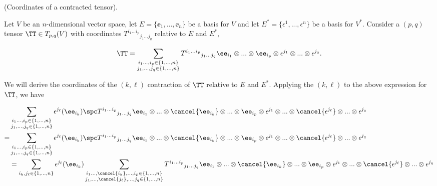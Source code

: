 \begin{deriv}
    (Coordinates of a contracted tensor).

    Let $V$ be an $n$-dimensional vector space, let $E = \{\ee_1, ..., \ee_n\}$ be a basis for $V$ and let $E^* = \{\epsilon^1, ..., \epsilon^n\}$ be a basis for $V^*$. Consider a $(p, q)$ tensor $\TT \in T_{p,q}(V)$ with coordinates $T^{i_1 ... i_p}{}_{j_1 ... j_q}$ relative to $E$ and $E^*$,
     
    \begin{align*}
        \TT = \sum_{\substack{i_1 ..., i_p \in \{1, ..., n\} \\ j_1, ..., j_q \in \{1, ..., n\}}} T^{i_1 ... i_p}{}_{j_1 ... j_q} \ee_{i_1} \otimes ... \otimes \ee_{i_p} \otimes \epsilon^{j_1} \otimes ... \otimes \epsilon^{j_q}.
    \end{align*}

    We will derive the coordinates of the $(k, \ell)$ contraction of $\TT$ relative to $E$ and $E^*$. Applying the $(k, \ell)$ to the above expression for $\TT$, we have
    
    \begin{align*}
        &\sum_{\substack{i_1 ..., i_p \in \{1, ..., n\} \\ j_1, ..., j_q \in \{1, ..., n\}}} \epsilon^{j_\ell}(\ee_{i_k}) \spc T^{i_1 ... i_p}{}_{j_1 ... j_q} \ee_{i_1} \otimes ... \otimes \cancel{\ee_{i_k}} \otimes ... \otimes \ee_{i_p} \otimes \epsilon^{j_1} \otimes ... \otimes \cancel{\epsilon^{j_\ell}} \otimes... \otimes \epsilon^{j_q} 
        \\
        = &\sum_{\substack{i_1 ..., i_p \in \{1, ..., n\} \\ j_1, ..., j_q \in \{1, ..., n\}}} \epsilon^{j_\ell}(\ee_{i_k}) \spc T^{i_1 ... i_p}{}_{j_1 ... j_q} \ee_{i_1} \otimes ... \otimes \cancel{\ee_{i_k}} \otimes ... \otimes \ee_{i_p} \otimes \epsilon^{j_1} \otimes ... \otimes \cancel{\epsilon^{j_\ell}} \otimes... \otimes \epsilon^{j_q} 
        \\
        &= \sum_{i_k, j_\ell \in \{1, ..., n\}} \epsilon^{j_\ell}(\ee_{i_k}) \sum_{\substack{i_1 ..., \cancel{i_k}, ..., i_p \in \{1, ..., n\} \\ j_1, ..., \cancel{j_\ell}, ..., j_q \in \{1, ..., n\}}} T^{i_1 ... i_p}{}_{j_1 ... j_q} \ee_{i_1} \otimes ... \otimes \cancel{\ee_{i_k}} \otimes ... \otimes \ee_{i_p} \otimes \epsilon^{j_1} \otimes ... \otimes \cancel{\epsilon^{j_\ell}} \otimes... \otimes \epsilon^{j_q} 
    \end{align*}
        

\end{deriv}

